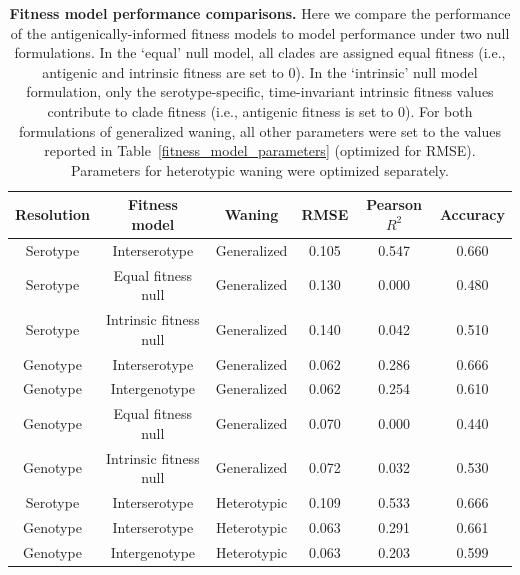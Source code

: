 \documentclass[11pt,oneside,letterpaper]{article}
\begin{document}
\begin{table}[ht]
  \centering
  \caption{
    \textbf{Fitness model performance comparisons.}
    Here we compare the performance of the antigenically-informed fitness models to model performance under two null formulations.
    In the `equal' null model, all clades are assigned equal fitness (i.e., antigenic and intrinsic fitness are set to 0).
    In the `intrinsic' null model formulation, only the serotype-specific, time-invariant intrinsic fitness values contribute to clade fitness (i.e., antigenic fitness is set to 0).
    For both formulations of generalized waning, all other parameters were set to the values reported in Table~\ref{fitness_model_parameters} (optimized for RMSE).
    Parameters for heterotypic waning were optimized separately.
  }
  \label{fitness_model_performance}
  \begin{tabular}{ c c c c c c }
    \hline
    Resolution  & Fitness model           & Waning        & RMSE    & Pearson $R^2$ & Accuracy \\
    \hline
    Serotype    & Interserotype           & Generalized   & 0.105   & 0.547         & 0.660 \\
    Serotype    & Equal fitness null      & Generalized   & 0.130   & 0.000         & 0.480 \\
    Serotype    & Intrinsic fitness null  & Generalized   & 0.140   & 0.042         & 0.510 \\
    Genotype    & Interserotype           & Generalized   & 0.062   & 0.286         & 0.666 \\
    Genotype    & Intergenotype           & Generalized   & 0.062   & 0.254         & 0.610 \\
    Genotype    & Equal fitness null      & Generalized   & 0.070   & 0.000         & 0.440 \\
    Genotype    & Intrinsic fitness null  & Generalized   & 0.072   & 0.032         & 0.530 \\
    Serotype    & Interserotype           & Heterotypic   & 0.109   & 0.533         & 0.666 \\
    Genotype    & Interserotype           & Heterotypic   & 0.063   & 0.291         & 0.661 \\
    Genotype    & Intergenotype           & Heterotypic   & 0.063   & 0.203         & 0.599 \\
    \hline
  \end{tabular}
\end{table}
\end{document}
